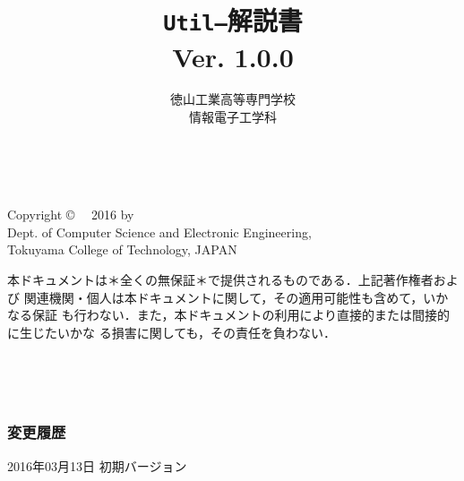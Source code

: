 \documentclass[11pt,a4j,twoside,dvipdfmx]{jbook}
\newcommand{\ver}{Ver. 1.0.0}
\newcommand{\util}{{\tt Util--}}
\begin{document}
\setlength{\oddsidemargin}{10pt}
\setlength{\evensidemargin}{-10pt}
\setlength{\headsep}{1cm}

\title{\util 解説書 \\\ver}
\author{徳山工業高等専門学校\\情報電子工学科}
\date{}

\maketitle

\thispagestyle{empty}
\onecolumn
~
\vfill
\begin{flushleft}
Copyright \copyright ~~ 2016 by \\
Dept. of Computer Science and Electronic Engineering, \\
Tokuyama College of Technology, JAPAN
\end{flushleft}


\vspace{0.8cm}

本ドキュメントは＊全くの無保証＊で提供されるものである．上記著作権者および
関連機関・個人は本ドキュメントに関して，その適用可能性も含めて，いかなる保証
も行わない．また，本ドキュメントの利用により直接的または間接的に生じたいかな
る損害に関しても，その責任を負わない．
\setcounter{page}{0}

\newpage
{}
\tableofcontents

\onecolumn
~
\thispagestyle{empty}
\setcounter{page}{0}

\newpage
{}


\appendix

\pagestyle{empty}
\onecolumn
~
\subsubsection{変更履歴}
\begin{flushleft}
2016年03月13日 初期バージョン  \\
\end{flushleft}
\end{document}

